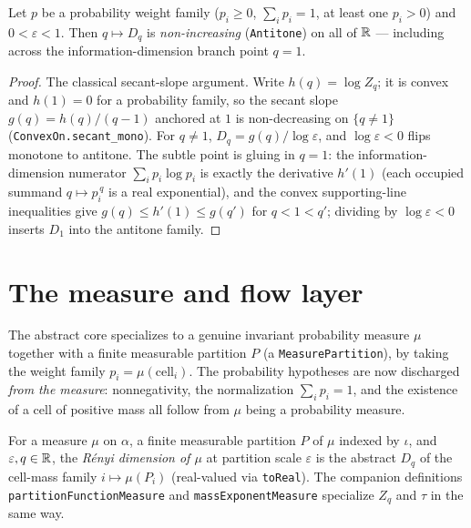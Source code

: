 \begin{theorem}\label{renyiDim_antitone}
  \leanok
  Let \(p\) be a probability weight family (\(p_i \ge 0\), \(\sum_i p_i = 1\), at least one
  \(p_i > 0\)) and \(0 < \varepsilon < 1\). Then \(q \mapsto D_q\) is \emph{non-increasing}
  (\texttt{Antitone}) on all of \(\mathbb{R}\) --- including across the information-dimension branch point
  \(q = 1\).
\end{theorem}
\begin{proof}\leanok
  The classical secant-slope argument. Write \(h(q) = \log Z_q\); it is convex and \(h(1) = 0\)
  for a probability family, so the secant slope \(g(q) = h(q)/(q-1)\) anchored at \(1\) is
  non-decreasing on \(\{q \ne 1\}\) (\texttt{ConvexOn.secant\_mono}). For \(q \ne 1\),
  \(D_q = g(q)/\log\varepsilon\), and \(\log\varepsilon < 0\) flips monotone to antitone. The
  subtle point is gluing in \(q = 1\): the information-dimension numerator
  \(\sum_i p_i \log p_i\) is exactly the derivative \(h'(1)\) (each occupied summand
  \(q \mapsto p_i^{\,q}\) is a real exponential), and the convex supporting-line inequalities give
  \(g(q) \le h'(1) \le g(q')\) for \(q < 1 < q'\); dividing by \(\log\varepsilon < 0\) inserts
  \(D_1\) into the antitone family.
\end{proof}

\section{The measure and flow layer}

The abstract core specializes to a genuine invariant probability measure \(\mu\) together with a
finite measurable partition \(P\) (a \texttt{MeasurePartition}), by taking the weight family
\(p_i = \mu(\text{cell}_i)\). The probability hypotheses are now discharged \emph{from the
measure}: nonnegativity, the normalization \(\sum_i p_i = 1\), and the existence of a cell of
positive mass all follow from \(\mu\) being a probability measure.

\begin{definition}\label{renyiDimMeasure}
  \leanok
  For a measure \(\mu\) on \(\alpha\), a finite measurable partition \(P\) of \(\mu\) indexed by
  \(\iota\), and \(\varepsilon, q \in \mathbb{R}\), the \emph{R\'enyi dimension of \(\mu\)} at partition
  scale \(\varepsilon\) is the abstract \(D_q\) of the cell-mass family
  \(i \mapsto \mu(P_i)\) (real-valued via \texttt{toReal}). The companion definitions
  \texttt{partitionFunctionMeasure} and \texttt{massExponentMeasure} specialize \(Z_q\) and
  \(\tau\) in the same way.
\end{definition}


